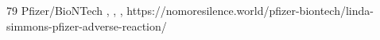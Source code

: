           {}
          {79}
          {Pfizer/BioNTech}
          {, }
          {
            ,
            ,
          }
          {https://nomoresilence.world/pfizer-biontech/linda-simmons-pfizer-adverse-reaction/}


